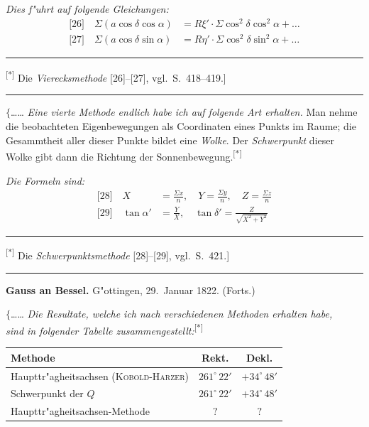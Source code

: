 \documentclass[12pt,a4paper]{article}
\theoremstyle{plain}
\theoremstyle{definition}
\theoremstyle{remark}
\begin{document}
{\itshape Dies f"uhrt auf folgende Gleichungen:}
\begin{align*}
\text{[26]}\quad \Sigma(a\cos\delta\cos\alpha) &= R\xi'\cdot\Sigma\cos^2\delta\cos^2\alpha + \ldots\\
\text{[27]}\quad \Sigma(a\cos\delta\sin\alpha) &= R\eta'\cdot\Sigma\cos^2\delta\sin^2\alpha + \ldots
\end{align*}

\rule{\textwidth}{0.4pt}
{\small
\textsuperscript{[*]} Die {\itshape Vierecksmethode} [26]--[27], vgl.\ S.\ 418--419.]
}
\rule{\textwidth}{0.4pt}

\vspace{1em}
\noindent
$\{$\ldots{}\ldots{} {\itshape Eine vierte Methode endlich habe ich auf folgende Art erhalten.} Man nehme die beobachteten Eigenbewegungen als Coordinaten eines Punkts im Raume; die Gesammtheit aller dieser Punkte bildet eine {\itshape Wolke}. Der {\itshape Schwerpunkt} dieser Wolke gibt dann die Richtung der Sonnenbewegung.\textsuperscript{[*]}

{\itshape Die Formeln sind:}
\begin{align*}
\text{[28]}\quad X &= \frac{\Sigma x}{n},\quad Y = \frac{\Sigma y}{n},\quad Z = \frac{\Sigma z}{n}\\
\text{[29]}\quad \tan\alpha' &= \frac{Y}{X},\quad \tan\delta' = \frac{Z}{\sqrt{X^2 + Y^2}}
\end{align*}

\rule{\textwidth}{0.4pt}
{\small
\textsuperscript{[*]} Die {\itshape Schwerpunktsmethode} [28]--[29], vgl.\ S.\ 421.]
}
\rule{\textwidth}{0.4pt}

\newpage
\begin{center}
\textbf{Gauss an Bessel.} \quad G"ottingen, 29.\ Januar 1822. (Forts.)
\end{center}

\noindent
$\{$\ldots{}\ldots{} {\itshape Die Resultate, welche ich nach verschiedenen Methoden erhalten habe,} \\ {\itshape sind in folgender Tabelle zusammengestellt:}\textsuperscript{[*]}

\begin{center}
\begin{tabular}{|l|c|c|}
\hline
\textbf{Methode} & \textbf{Rekt.} & \textbf{Dekl.} \\
\hline
Haupttr"agheitsachsen (\textsc{Kobold-Harzer}) & $261^{\circ}\,22'$ & $+34^{\circ}\,48'$ \\
Schwerpunkt der $Q$ & $261^{\circ}\,22'$ & $+34^{\circ}\,48'$ \\
Haupttr"agheitsachsen-Methode & $?$ & $?$ \\
\hline
\end{tabular}
\end{center}
\end{document}
